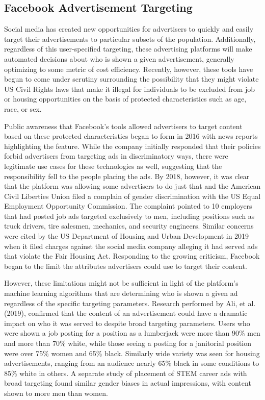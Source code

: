 \documentclass[]{krantz}
\begin{document}
\subsection{Facebook Advertisement
Targeting}\label{facebook-advertisement-targeting}

Social media has created new opportunities for advertisers to quickly
and easily target their advertisements to particular subsets of the
population. Additionally, regardless of this user-specified targeting,
these advertising platforms will make automated decisions about who is
shown a given advertisement, generally optimizing to some metric of cost
efficiency. Recently, however, these tools have begun to come under
scrutiny surrounding the possibility that they might violate US Civil
Rights laws that make it illegal for individuals to be excluded from job
or housing opportunities on the basis of protected characteristics such
as age, race, or sex.

Public awareness that Facebook's tools allowed advertisers to target
content based on these protected characteristics began to form in 2016
with news reports highlighting the feature. While the company initially
responded that their policies forbid advertisers from targeting ads in
discriminatory ways, there were legitimate use cases for these
technologies as well, suggesting that the responsibility fell to the
people placing the ads. By 2018, however, it was clear that the platform
was allowing some advertisers to do just that and the American Civil
Liberties Union filed a complain of gender discrimination with the US
Equal Employment Opportunity Commission. The complaint pointed to 10
employers that had posted job ads targeted exclusively to men, including
positions such as truck drivers, tire salesmen, mechanics, and security
engineers. Similar concerns were cited by the US Department of Housing
and Urban Development in 2019 when it filed charges against the social
media company alleging it had served ads that violate the Fair Housing
Act. Responding to the growing criticism, Facebook began to the limit
the attributes advertisers could use to target their content.

However, these limitations might not be sufficient in light of the
platform's machine learning algorithms that are determining who is shown
a given ad regardless of the specific targeting parameters. Research
performed by Ali, et al. (2019), confirmed that the content of an
advertisement could have a dramatic impact on who it was served to
despite broad targeting parameters. Users who were shown a job posting
for a position as a lumberjack were more than 90\% men and more than
70\% white, while those seeing a posting for a janitorial position were
over 75\% women and 65\% black. Similarly wide variety was seen for
housing advertisements, ranging from an audience nearly 65\% black in
some conditions to 85\% white in others. A separate study of placement
of STEM career ads with broad targeting found similar gender biases in
actual impressions, with content shown to more men than women.
\end{document}
